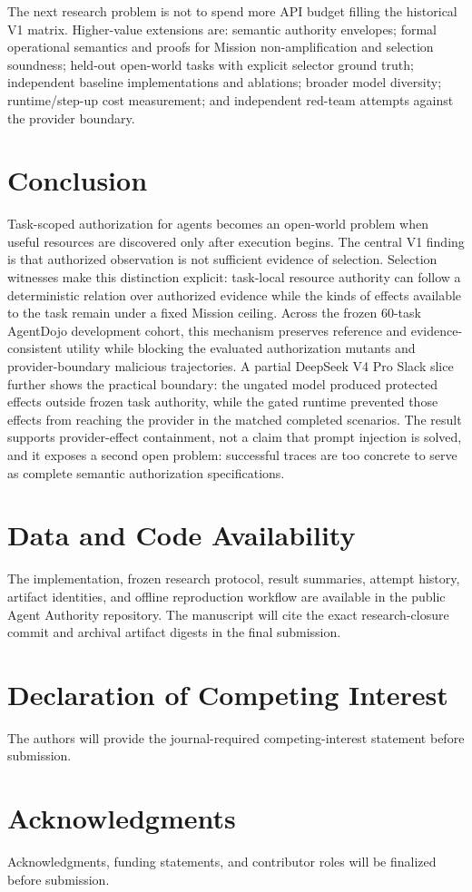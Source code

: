 \documentclass[5p,times,twocolumn]{elsarticle}
\begin{document}
The next research problem is not to spend more API budget filling the historical V1 matrix. Higher-value extensions are: semantic authority envelopes; formal operational semantics and proofs for Mission non-amplification and selection soundness; held-out open-world tasks with explicit selector ground truth; independent baseline implementations and ablations; broader model diversity; runtime/step-up cost measurement; and independent red-team attempts against the provider boundary.

\section{Conclusion}
\label{sec:conclusion}

Task-scoped authorization for agents becomes an open-world problem when useful resources are discovered only after execution begins. The central V1 finding is that authorized observation is not sufficient evidence of selection. Selection witnesses make this distinction explicit: task-local resource authority can follow a deterministic relation over authorized evidence while the kinds of effects available to the task remain under a fixed Mission ceiling. Across the frozen 60-task AgentDojo development cohort, this mechanism preserves reference and evidence-consistent utility while blocking the evaluated authorization mutants and provider-boundary malicious trajectories. A partial DeepSeek V4 Pro Slack slice further shows the practical boundary: the ungated model produced protected effects outside frozen task authority, while the gated runtime prevented those effects from reaching the provider in the matched completed scenarios. The result supports provider-effect containment, not a claim that prompt injection is solved, and it exposes a second open problem: successful traces are too concrete to serve as complete semantic authorization specifications.

\section*{Data and Code Availability}

The implementation, frozen research protocol, result summaries, attempt history, artifact identities, and offline reproduction workflow are available in the public Agent Authority repository. The manuscript will cite the exact research-closure commit and archival artifact digests in the final submission.

\section*{Declaration of Competing Interest}

The authors will provide the journal-required competing-interest statement before submission.

\section*{Acknowledgments}

Acknowledgments, funding statements, and contributor roles will be finalized before submission.



\end{document}
